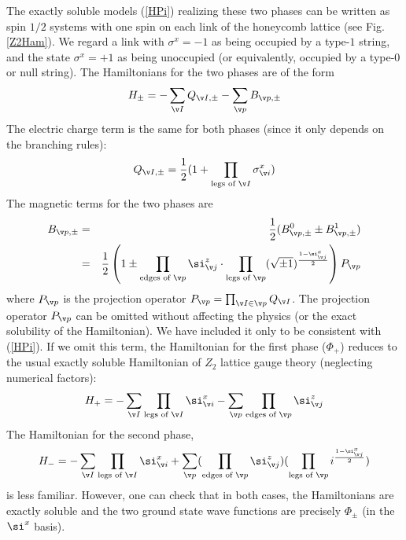 \documentclass[aps,twocolumn,groupedaddress,showpacs,floatfix]{revtex4}
\begin{document}
The exactly soluble models (\ref{HPi}) realizing these two phases can be
written as spin $1/2$ systems with one spin on each link of the 
honeycomb lattice (see Fig. \ref{Z2Ham}). We regard a link with 
$\sigma^{x} = -1$ as being occupied by a type-$1$ string, and the state 
$\sigma^{x} = +1$ as being unoccupied (or equivalently, occupied by a type-$0$ 
or null string). The Hamiltonians for the two phases are of the form
\begin{displaymath} 
H_{\pm}= - \sum_{\v I} Q_{\v I,\pm}-\sum_{\v p} B_{\v p,\pm}
\end{displaymath}
The electric charge term is the same for both phases (since it only depends
on the branching rules):
\begin{equation}
Q_{\v I,\pm} = \frac{1}{2}(1 +\prod_{\text{legs of } \v I} \sigma_{\v i}^{x})
\end{equation}
The magnetic terms for the two phases are
\begin{eqnarray}
B_{\v p,\pm} &=& \frac{1}{2}(B_{\v p,\pm}^{0} \pm B_{\v p,\pm}^{1})  \\
&=&\frac{1}{2}\left (1 \pm \prod_{\text{edges of }\v p} \si^z_{\v j} \cdot
\prod_{\text{legs of }\v p} (\sqrt{\pm 1})^{\frac{1-\si^{x}_{\v j}}{2}}
\right) P_{\v p}
\nonumber 
\end{eqnarray}
where $P_{\v p}$ is the projection operator 
$P_{\v p} = \prod_{\v I \in \v p} Q_{\v I}$. The projection operator 
$P_{\v p}$ can be omitted without affecting the physics (or the exact 
solubility of the Hamiltonian). We have included it only to be consistent with 
(\ref{HPi}). If we omit this term, the Hamiltonian for the first phase
($\Phi_{+}$) reduces to the usual exactly soluble Hamiltonian of $Z_2$ lattice
gauge theory (neglecting numerical factors):
\begin{equation}
H_{+} = - \sum_{\v I} \prod_{\text{legs of } \v I} \si_{\v i}^{x}
-\sum_{\v p}\prod_{\text{edges of }\v p} \si^z_{\v j}
\label{Z2}
\end{equation}
The Hamiltonian for the second phase,
\begin{equation}
H_{-} = - \sum_{\v I} \prod_{\text{legs of } \v I} \si_{\v i}^{x}
+\sum_{\v p}(\prod_{\text{edges of }\v p} \si^z_{\v j})
(\prod_{\text{legs of }\v p} i^{\frac{1-\si^{x}_{\v j}}{2}})
\label{sem}
\end{equation} 
is less familiar. However, one can check that in both cases, the Hamiltonians 
are exactly soluble and the two ground state wave functions are precisely 
$\Phi_{\pm}$ (in the $\si^{x}$ basis). 
\end{document}
